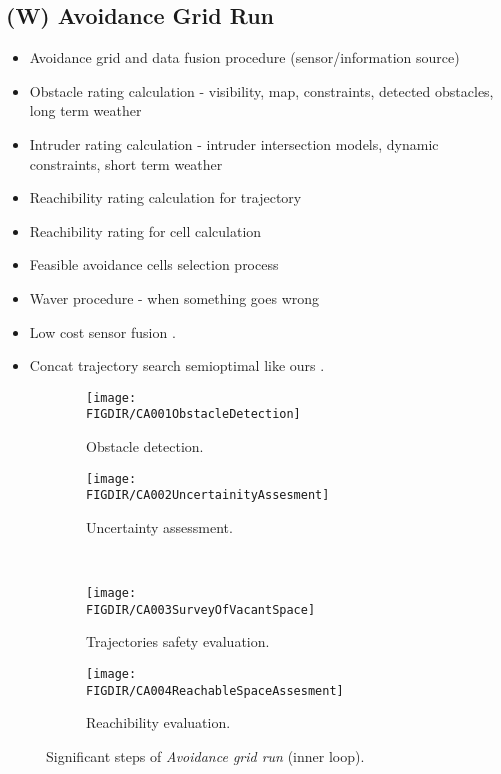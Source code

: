 \subsection{(W) Avoidance Grid Run}\label{s:aviudabceGridRun}

\begin{itemize}
    \item Avoidance grid and data fusion procedure (sensor/information source)
    \item Obstacle rating calculation - visibility, map, constraints, detected obstacles, long term weather
    \item Intruder rating calculation - intruder intersection models, dynamic constraints, short term weather
    \item Reachibility rating calculation for trajectory
    \item Reachibility rating for cell calculation
    \item Feasible avoidance cells selection process
    \item Waver procedure - when something goes wrong
	\item Low cost sensor fusion \cite{sabatini2013low}.
	\item Concat trajectory search semioptimal like ours \cite{shaw1998using}.
\end{itemize}

\begin{figure}[H]
\centering
    \begin{subfigure}{0.48\textwidth}
        \texttt{[image: \\FIGDIR/CA001ObstacleDetection]}
        \caption{Obstacle detection.}
        \label{fig:obstacleDetectionAvoidanceGrid}
    \end{subfigure}
    \begin{subfigure}{0.48\textwidth}
        \texttt{[image: \\FIGDIR/CA002UncertainityAssesment]} 
        \caption{Uncertainty assessment.}
        \label{fig:uncertainityAssesmentAvoidanceGrid}
    \end{subfigure}
    \\
    \begin{subfigure}{0.48\textwidth}
        \texttt{[image: \\FIGDIR/CA003SurveyOfVacantSpace]} 
        \caption{Trajectories safety evaluation.}
        \label{fig:trajectoriesSafetyEvaluationAvoidanceGrid}
    \end{subfigure}
    \begin{subfigure}{0.48\textwidth}
        \texttt{[image: \\FIGDIR/CA004ReachableSpaceAssesment]} 
        \caption{Reachibility evaluation.}
        \label{fig:reachibilityAssessmentAvoidanceGrid}
    \end{subfigure}
    \caption{Significant steps of \emph{Avoidance grid run} (inner loop).}
    \label{fig:significantStepsofAvoidanceGridRun}
\end{figure}


